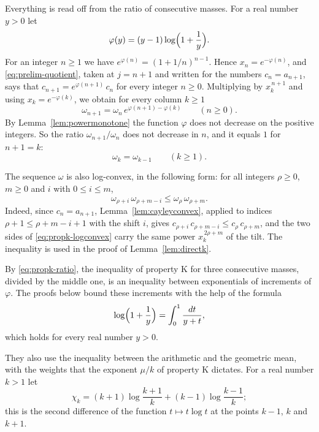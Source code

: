 \documentclass{amsart}
\theoremstyle{definition}
\theoremstyle{remark}
\numberwithin{equation}{section}
\begin{document}
Everything is read off from the ratio of consecutive masses. For a real
number $y>0$ let
\[
\varphi(y)=(y-1)\log\Bigl(1+\frac1y\Bigr).
\]
For an integer $n\ge1$ we have $e^{\varphi(n)}=(1+1/n)^{n-1}$. Hence
$x_n=e^{-\varphi(n)}$, and \eqref{eq:prelim-quotient}, taken at $j=n+1$ and
written for the numbers $c_n=a_{n+1}$, says that
$c_{n+1}=e^{\varphi(n+1)}\,c_n$ for every integer $n\ge0$. Multiplying by
$x_k^{\,n+1}$ and using $x_k=e^{-\varphi(k)}$, we obtain for every
column $k\ge1$
\begin{equation}\label{eq:propk-ratio}
\omega_{n+1}=\omega_n\,e^{\varphi(n+1)-\varphi(k)}\qquad(n\ge0).
\end{equation}
By Lemma~\ref{lem:powermonotone} the function $\varphi$ does not decrease on
the positive integers. So the ratio $\omega_{n+1}/\omega_n$ does not
decrease in $n$, and it equals $1$
for $n+1=k$:
\begin{equation}\label{eq:propk-flat}
\omega_k=\omega_{k-1}\qquad(k\ge1).
\end{equation}

The sequence $\omega$ is also log-convex, in the following form: for all
integers $\rho\ge0$, $m\ge0$ and $i$ with $0\le i\le m$,
\begin{equation}\label{eq:propk-logconvex}
\omega_{\rho+i}\,\omega_{\rho+m-i}\le\omega_\rho\,\omega_{\rho+m} .
\end{equation}
Indeed, since $c_n=a_{n+1}$, Lemma~\ref{lem:cayleyconvex}, applied to
indices $\rho+1\le\rho+m-i+1$ with the shift $i$, gives
$c_{\rho+i}\,c_{\rho+m-i}\le c_\rho\,c_{\rho+m}$, and the two sides of
\eqref{eq:propk-logconvex} carry the same power $x_k^{\,2\rho+m}$ of the
tilt. The inequality is used in the proof of Lemma~\ref{lem:directk}.

By \eqref{eq:propk-ratio}, the inequality of property K for three
consecutive masses, divided by the middle one, is an inequality between
exponentials of increments of $\varphi$. The proofs below bound these
increments with the help of the formula
\begin{equation}\label{eq:propk-integral}
\log\Bigl(1+\frac1y\Bigr)=\int_0^1\frac{dt}{y+t} ,
\end{equation}
which holds for every real number $y>0$.

They also use the inequality
between the arithmetic and the geometric mean, with the weights that the
exponent $\mu/k$ of property K dictates. For a real number $k>1$ let
\[
\chi_k=(k+1)\log\frac{k+1}{k}+(k-1)\log\frac{k-1}{k} ;
\]
this is the second difference of the function $t\mapsto t\log t$ at the
points $k-1$, $k$ and $k+1$.
\end{document}
